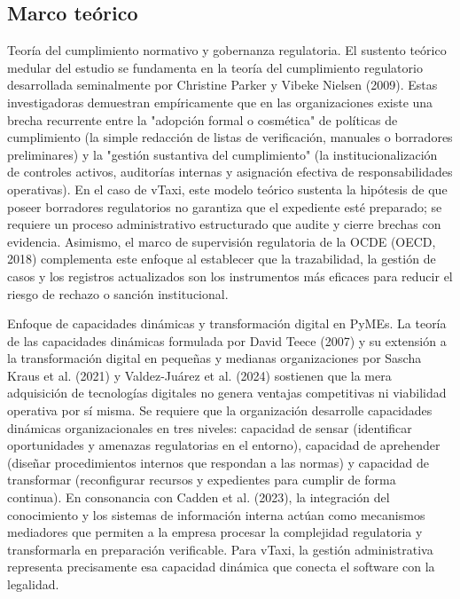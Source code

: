 {\subsection{Marco teórico}
Teoría del cumplimiento normativo y gobernanza regulatoria. El sustento teórico medular del estudio se fundamenta en la teoría del cumplimiento regulatorio desarrollada seminalmente por Christine Parker y Vibeke Nielsen (2009). Estas investigadoras demuestran empíricamente que en las organizaciones existe una brecha recurrente entre la "adopción formal o cosmética" de políticas de cumplimiento (la simple redacción de listas de verificación, manuales o borradores preliminares) y la "gestión sustantiva del cumplimiento" (la institucionalización de controles activos, auditorías internas y asignación efectiva de responsabilidades operativas). En el caso de vTaxi, este modelo teórico sustenta la hipótesis de que poseer borradores regulatorios no garantiza que el expediente esté preparado; se requiere un proceso administrativo estructurado que audite y cierre brechas con evidencia. Asimismo, el marco de supervisión regulatoria de la OCDE (OECD, 2018) complementa este enfoque al establecer que la trazabilidad, la gestión de casos y los registros actualizados son los instrumentos más eficaces para reducir el riesgo de rechazo o sanción institucional.


Enfoque de capacidades dinámicas y transformación digital en PyMEs. La teoría de las capacidades dinámicas formulada por David Teece (2007) y su extensión a la transformación digital en pequeñas y medianas organizaciones por Sascha Kraus et al. (2021) y Valdez-Juárez et al. (2024) sostienen que la mera adquisición de tecnologías digitales no genera ventajas competitivas ni viabilidad operativa por sí misma. Se requiere que la organización desarrolle capacidades dinámicas organizacionales en tres niveles: capacidad de sensar (identificar oportunidades y amenazas regulatorias en el entorno), capacidad de aprehender (diseñar procedimientos internos que respondan a las normas) y capacidad de transformar (reconfigurar recursos y expedientes para cumplir de forma continua). En consonancia con Cadden et al. (2023), la integración del conocimiento y los sistemas de información interna actúan como mecanismos mediadores que permiten a la empresa procesar la complejidad regulatoria y transformarla en preparación verificable. Para vTaxi, la gestión administrativa representa precisamente esa capacidad dinámica que conecta el software con la legalidad.


}
